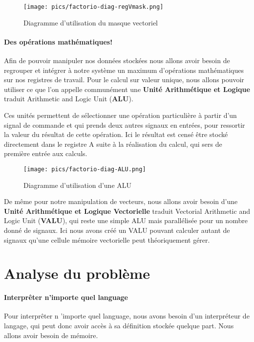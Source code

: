 \begin{figure}[h]
\centering
\texttt{[image: pics/factorio-diag-regVmask.png]}

\caption{Diagramme d'utilisation du masque vectoriel}
\end{figure}

\paragraph{Des opérations mathématiques!}
Afin de pouvoir manipuler nos données stockées nous allons avoir besoin de regrouper et intégrer à notre système un maximum d'opérations mathématiques sur nos registres de travail.
Pour le calcul sur valeur unique, nous allons pouvoir utiliser ce que l'on appelle communément une \textbf{Unité Arithmétique et Logique} traduit Arithmetic and Logic Unit (\textbf{ALU}).

Ces unités permettent de sélectionner une opération particulière à partir d'un signal de commande et qui prends deux autres signaux en entrées, pour ressortir la valeur du résultat de cette opération.
Ici le résultat est censé être stocké directement dans le registre A suite à la réalisation du calcul, qui sers de première entrée aux calculs.

\begin{figure}[h]
\centering
\texttt{[image: pics/factorio-diag-ALU.png]}

\caption{Diagramme d'utilisation d'une ALU}
\end{figure}

De même pour notre manipulation de vecteurs, nous allons avoir besoin d'une \textbf{Unité Arithmétique et Logique Vectorielle} traduit Vectorial Arithmetic and Logic Unit (\textbf{VALU}), qui reste une simple ALU mais parallélisée pour un nombre donné de signaux.
Ici nous avons créé un VALU pouvant calculer autant de signaux qu'une cellule mémoire vectorielle peut théoriquement gérer. 




\section{Analyse du problème}




\paragraph{Interprêter n'importe quel language}
Pour interprêter n 'importe quel language, nous avons besoin d'un interpréteur de langage, qui peut donc avoir accès à sa définition stockée quelque part. Nous allons avoir besoin de mémoire. 

